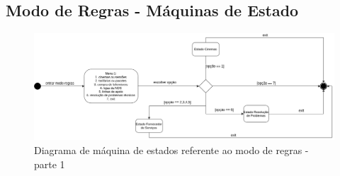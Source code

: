 \documentclass[11pt,a4paper]{article}
\begin{document}
\begin{appendices}

\section{Modo de Regras - Máquinas de Estado}\label{anexo1}

\begin{figure}[H]
    \centering
    \includegraphics[width=15cm]{images/PEI_StateMachine-PEI_StateMachine.png}
    \caption{Diagrama de máquina de estados referente ao modo de regras - parte 1}
    \label{machine1}
\end{figure}


\end{appendices}
\end{document}
